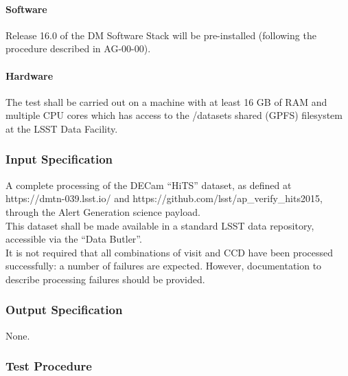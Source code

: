 \paragraph{Software}

Release 16.0 of the DM Software Stack will be pre-installed (following
the procedure described in AG-00-00).



\paragraph{Hardware}

The test shall be carried out on a machine with at least 16 GB of RAM
and multiple CPU cores which has access to the /datasets shared (GPFS)
filesystem at the LSST Data Facility.



\subsubsection{Input Specification}

A complete processing of the DECam ``HiTS'' dataset, as defined at
https://dmtn-039.lsst.io/ and
https://github.com/lsst/ap\_verify\_hits2015, through the Alert
Generation science payload.\\
This dataset shall be made available in a standard LSST data repository,
accessible via the ``Data Butler''.\\
It is not required that all combinations of visit and CCD have been
processed successfully: a number of failures are expected. However,
documentation to describe processing failures should be provided.



\subsubsection{Output Specification}

None.



\subsubsection{Test Procedure}

